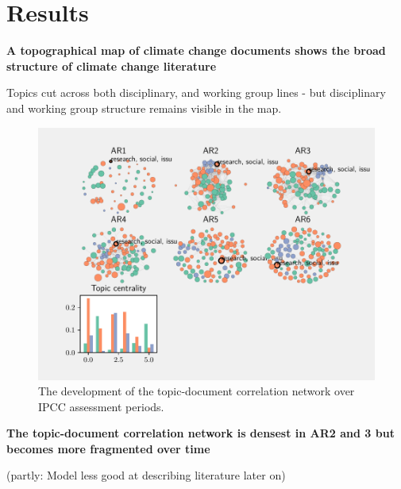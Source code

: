 \documentclass{article}
\begin{document}
\section*{Results}

\bigskip
\noindent\textbf{A topographical map of climate change documents shows the broad structure of climate change literature}

Topics cut across both disciplinary, and working group lines - but disciplinary and working group structure remains visible in the map.


\begin{figure}
	\begin{center}
		\includegraphics[width=1\linewidth]{plots/network_development_wgs_665.pdf}
		\caption{The development of the topic-document correlation network over IPCC assessment periods.}
		\label{}
	\end{center}
\end{figure}

\bigskip
\noindent\textbf{The topic-document correlation network is densest in AR2 and 3 but becomes more fragmented over time}

(partly: Model less good at describing literature later on)
\end{document}
